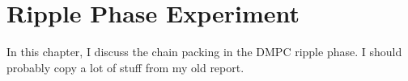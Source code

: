\chapter{Ripple Phase Experiment}
In this chapter, I discuss the chain packing in the DMPC ripple phase. I should probably copy a lot of stuff from my old report.